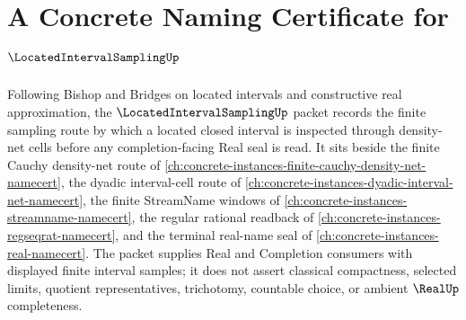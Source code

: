 \chapter{A Concrete Naming Certificate for $\LocatedIntervalSamplingUp$}
\label{ch:concrete-instances-located-interval-sampling-namecert}

Following Bishop and Bridges on located intervals and constructive real approximation, the $\LocatedIntervalSamplingUp$ packet records the finite sampling route by which a located closed interval is inspected through density-net cells before any completion-facing Real seal is read. It sits beside the finite Cauchy density-net route of \autoref{ch:concrete-instances-finite-cauchy-density-net-namecert}, the dyadic interval-cell route of \autoref{ch:concrete-instances-dyadic-interval-net-namecert}, the finite StreamName windows of \autoref{ch:concrete-instances-streamname-namecert}, the regular rational readback of \autoref{ch:concrete-instances-regseqrat-namecert}, and the terminal real-name seal of \autoref{ch:concrete-instances-real-namecert}. The packet supplies Real and Completion consumers with displayed finite interval samples; it does not assert classical compactness, selected limits, quotient representatives, trichotomy, countable choice, or ambient $\RealUp$ completeness.

